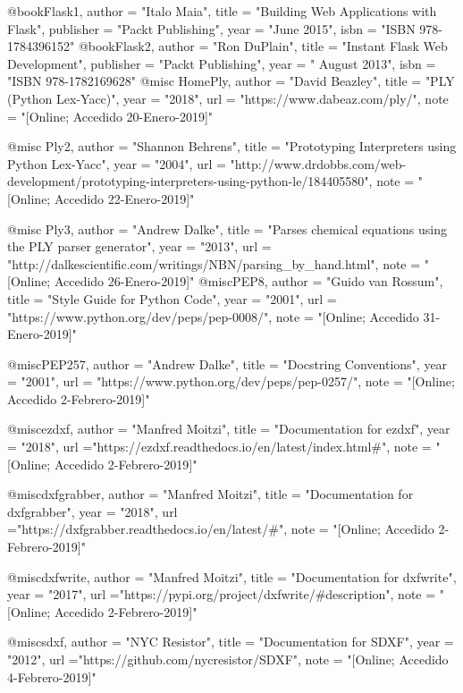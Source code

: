 @book{Flask1,
		author    = "Italo Maia",
		title     = "Building Web Applications  with Flask",
		publisher = "Packt Publishing",
		year      = "June 2015",
		isbn      = "ISBN 978-1784396152"		
}
@book{Flask2,
		author    = "Ron DuPlain",
		title     = "Instant Flask Web Development",
		publisher = "Packt Publishing",
		year      = " August 2013",
		isbn      = "ISBN 978-1782169628"
}
@misc{ HomePly,
       author = "David Beazley",
       title = "PLY (Python Lex-Yacc)",
       year = "2018",
       url = "https://www.dabeaz.com/ply/",
       note = "[Online; Accedido 20-Enero-2019]"
}

@misc{ Ply2,
       author = "Shannon Behrens",
       title = "Prototyping Interpreters using Python Lex-Yacc",
       year = "2004",
       url = "http://www.drdobbs.com/web-development/prototyping-interpreters-using-python-le/184405580",
       note = "[Online; Accedido 22-Enero-2019]"
}

@misc{ Ply3,
       author = "Andrew Dalke",
       title = "Parses chemical equations using the PLY parser generator",
       year = "2013",
       url = "http://dalkescientific.com/writings/NBN/parsing_by_hand.html",
       note = "[Online; Accedido 26-Enero-2019]"
}
@misc{PEP8,
       author = "Guido van Rossum",
       title = "Style Guide for Python Code",
       year = "2001",
       url = "https://www.python.org/dev/peps/pep-0008/",
       note = "[Online; Accedido 31-Enero-2019]"
}

@misc{PEP257,
       author = "Andrew Dalke",
       title = "Docstring Conventions",
       year = "2001",
       url = "https://www.python.org/dev/peps/pep-0257/",
       note = "[Online; Accedido 2-Febrero-2019]"
}


@misc{ezdxf,
       author = "Manfred Moitzi",
       title = "Documentation for ezdxf",
       year = "2018",
       url ="https://ezdxf.readthedocs.io/en/latest/index.html#",
       note = "[Online; Accedido 2-Febrero-2019]"
}

@misc{dxfgrabber,
       author = "Manfred Moitzi",
       title = "Documentation for dxfgrabber",
       year = "2018",
       url ="https://dxfgrabber.readthedocs.io/en/latest/#",
       note = "[Online; Accedido 2-Febrero-2019]"
}

@misc{dxfwrite,
       author = "Manfred Moitzi",
       title = "Documentation for dxfwrite",
       year = "2017",
       url ="https://pypi.org/project/dxfwrite/#description",
       note = "[Online; Accedido 2-Febrero-2019]"
}

@misc{sdxf,
       author = "NYC Resistor",
       title = "Documentation for SDXF",
       year = "2012",
       url ="https://github.com/nycresistor/SDXF",
       note = "[Online; Accedido 4-Febrero-2019]"
}

